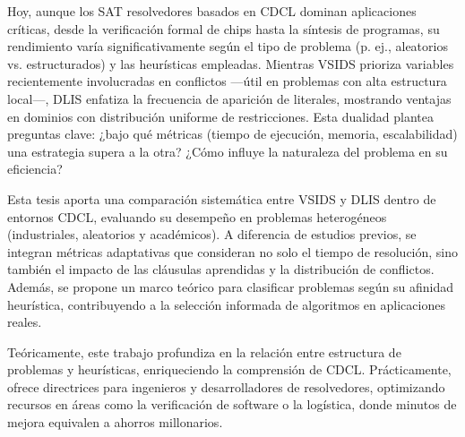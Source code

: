 




Hoy, aunque los SAT resolvedores basados en CDCL dominan aplicaciones críticas, desde la verificación formal de chips hasta la síntesis de programas, su rendimiento varía significativamente según el tipo de problema (p. ej., aleatorios vs. estructurados) y las heurísticas empleadas. Mientras VSIDS prioriza variables recientemente involucradas en conflictos —útil en problemas con alta estructura local—, DLIS enfatiza la frecuencia de aparición de literales, mostrando ventajas en dominios con distribución uniforme de restricciones. Esta dualidad plantea preguntas clave: ¿bajo qué métricas (tiempo de ejecución, memoria, escalabilidad) una estrategia supera a la otra? ¿Cómo influye la naturaleza del problema en su eficiencia?

Esta tesis aporta una comparación sistemática entre VSIDS y DLIS dentro de entornos CDCL, evaluando su desempeño en problemas heterogéneos (industriales, aleatorios y académicos). A diferencia de estudios previos, se integran métricas adaptativas que consideran no solo el tiempo de resolución, sino también el impacto de las cláusulas aprendidas y la distribución de conflictos. Además, se propone un marco teórico para clasificar problemas según su afinidad heurística, contribuyendo a la selección informada de algoritmos en aplicaciones reales.

Teóricamente, este trabajo profundiza en la relación entre estructura de problemas y heurísticas, enriqueciendo la comprensión de CDCL. Prácticamente, ofrece directrices para ingenieros y desarrolladores de resolvedores, optimizando recursos en áreas como la verificación de software o la logística, donde minutos de mejora equivalen a ahorros millonarios.

